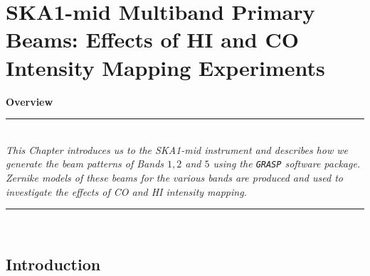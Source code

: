 \chapter{SKA1-mid Multiband Primary Beams: Effects of HI and CO Intensity Mapping Experiments} %
\label{Chapter6} %

\textbf{Overview}\\
\par\noindent\rule{\textwidth}{0.4pt}\\
 \textit{This Chapter introduces us to the SKA1-mid instrument and describes how we generate the beam patterns of Bands $1, 2$ and $5$ using the {\tt GRASP} software package.
 Zernike models of these beams for the various bands are produced  and used to investigate the effects of CO and HI intensity mapping.
}
\par\noindent\rule{\textwidth}{0.4pt}\\


\section{Introduction}	  \label{chap6:intro}

